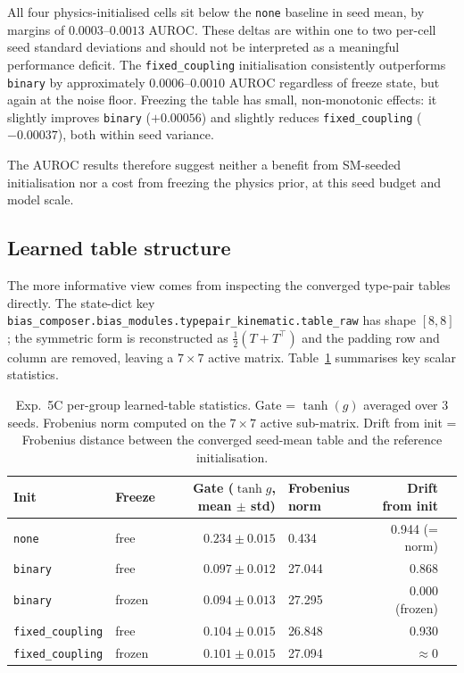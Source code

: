 All four physics-initialised cells sit below the \texttt{none} baseline in
seed mean, by margins of $0.0003$--$0.0013$ AUROC. These deltas are within
one to two per-cell seed standard deviations and should not be interpreted
as a meaningful performance deficit. The \texttt{fixed\_coupling}
initialisation consistently outperforms \texttt{binary} by approximately
$0.0006$--$0.0010$ AUROC regardless of freeze state, but again at the noise
floor. Freezing the table has small, non-monotonic effects: it slightly
improves \texttt{binary} ($+0.00056$) and slightly reduces
\texttt{fixed\_coupling} ($-0.00037$), both within seed variance.

The AUROC results therefore suggest neither a benefit from SM-seeded
initialisation nor a cost from freezing the physics prior, at this seed
budget and model scale.

\subsection{Learned table structure}

The more informative view comes from inspecting the converged type-pair
tables directly. The state-dict key
\texttt{bias\_composer.bias\_modules.\allowbreak{}typepair\_kinematic.\allowbreak{}table\_raw}
has shape $[8,8]$; the symmetric form is reconstructed as
$\frac{1}{2}(T + T^\top)$ and the padding row and column are removed,
leaving a $7\times 7$ active matrix. Table~\ref{tab:5c_table_stats}
summarises key scalar statistics.

\begin{table}[h]
\centering\small
\begin{tabular}{llrlrl}
\toprule
Init & Freeze & Gate ($\tanh g$, mean $\pm$ std) & Frobenius norm & Drift from init \\
\midrule
\texttt{none}            & free   & $0.234 \pm 0.015$ & 0.434  & 0.944 (= norm) \\
\texttt{binary}          & free   & $0.097 \pm 0.012$ & 27.044 & 0.868 \\
\texttt{binary}          & frozen & $0.094 \pm 0.013$ & 27.295 & 0.000 (frozen) \\
\texttt{fixed\_coupling} & free   & $0.104 \pm 0.015$ & 26.848 & 0.930 \\
\texttt{fixed\_coupling} & frozen & $0.101 \pm 0.015$ & 27.094 & $\approx 0$ \\
\bottomrule
\end{tabular}
\caption{Exp.\ 5C per-group learned-table statistics. Gate = $\tanh(g)$
averaged over 3 seeds. Frobenius norm computed on the $7\times 7$ active
sub-matrix. Drift from init = Frobenius distance between the converged
seed-mean table and the reference initialisation.}
\label{tab:5c_table_stats}
\end{table}

